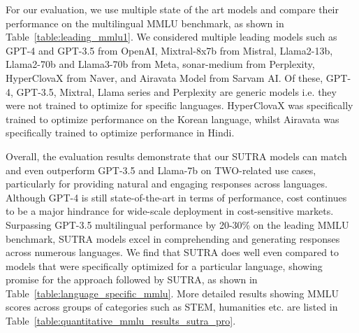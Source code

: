 \documentclass{article}
\begin{document}
For our evaluation, we use multiple state of the art models and compare their performance on the multilingual MMLU benchmark, as shown in Table~\ref{table:leading_mmlu1}. We considered multiple leading models such as GPT-4 and GPT-3.5 from OpenAI, Mixtral-8x7b from Mistral, Llama2-13b, Llama2-70b and Llama3-70b from Meta,  sonar-medium from Perplexity, HyperClovaX from Naver, and Airavata Model from Sarvam AI. Of these, GPT-4, GPT-3.5, Mixtral, Llama series and Perplexity are generic models i.e. they were not trained to optimize for specific languages. HyperClovaX was specifically trained to optimize performance on the Korean language, whilst Airavata was specifically trained to optimize performance in Hindi.

Overall, the evaluation results demonstrate that our SUTRA models can match and even outperform GPT-3.5 and Llama-7b on TWO-related use cases, particularly for providing natural and engaging responses across languages. Although GPT-4 is still state-of-the-art in terms of performance, cost continues to be a major hindrance for wide-scale deployment in cost-sensitive markets. Surpassing GPT-3.5 multilingual performance by 20-30\% on the leading MMLU benchmark, SUTRA models excel in comprehending and generating responses across numerous languages. We find that SUTRA does well even compared to models that were specifically optimized for a particular language, showing promise for the approach followed by SUTRA, as shown in Table~\ref{table:language_specific_mmlu}.
More detailed results showing MMLU scores across groups of categories such as STEM, humanities etc. are listed in Table~\ref{table:quantitative_mmlu_results_sutra_pro}.
\end{document}
